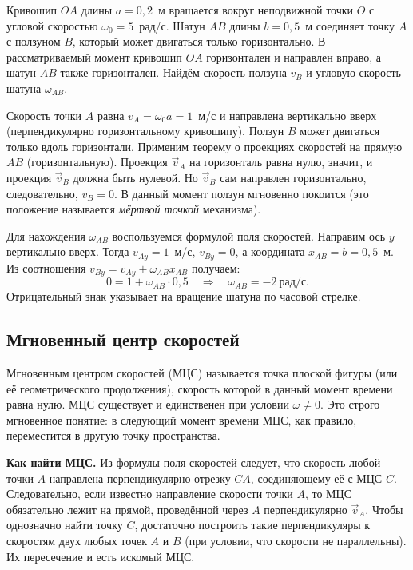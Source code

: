 \documentclass[../main.tex]{subfiles}
\begin{document}
\begin{example}
Кривошип $OA$ длины $a = 0{,}2$~м вращается вокруг неподвижной точки $O$
с угловой скоростью $\omega_0 = 5$~рад/с.
Шатун $AB$ длины $b = 0{,}5$~м соединяет точку $A$ с ползуном $B$,
который может двигаться только горизонтально.
В рассматриваемый момент кривошип $OA$ горизонтален и направлен вправо,
а шатун $AB$ также горизонтален. Найдём скорость ползуна $v_B$
и угловую скорость шатуна $\omega_{AB}$.

Скорость точки $A$ равна $v_A = \omega_0 a = 1$~м/с и направлена
вертикально вверх (перпендикулярно горизонтальному кривошипу).
Ползун $B$ может двигаться только вдоль горизонтали.
Применим теорему о проекциях скоростей на прямую $AB$ (горизонтальную).
Проекция $\vec{v}_A$ на горизонталь равна нулю, значит,
и проекция $\vec{v}_B$ должна быть нулевой. Но $\vec{v}_B$ сам направлен
горизонтально, следовательно, $v_B = 0$.
В данный момент ползун мгновенно покоится (это положение называется
\textit{мёртвой точкой} механизма).

Для нахождения $\omega_{AB}$ воспользуемся формулой поля скоростей.
Направим ось $y$ вертикально вверх. Тогда $v_{Ay} = 1$~м/с, $v_{By} = 0$,
а координата $x_{AB} = b = 0{,}5$~м.
Из соотношения $v_{By} = v_{Ay} + \omega_{AB} x_{AB}$ получаем:
\[
0 = 1 + \omega_{AB} \cdot 0{,}5 \quad\Longrightarrow\quad
\omega_{AB} = -2~\text{рад/с}.
\]
Отрицательный знак указывает на вращение шатуна по часовой стрелке.
\end{example}

\subsection{Мгновенный центр скоростей}

\begin{definition}
Мгновенным центром скоростей (МЦС) называется точка плоской фигуры
(или её геометрического продолжения), скорость которой в данный момент
времени равна нулю. МЦС существует и единственен при условии $\omega \ne 0$.
Это строго мгновенное понятие: в следующий момент времени МЦС, как правило,
переместится в другую точку пространства.
\end{definition}

\noindent\textbf{Как найти МЦС.}
Из формулы поля скоростей следует, что скорость любой точки $A$ направлена
перпендикулярно отрезку $CA$, соединяющему её с МЦС $C$. Следовательно,
если известно направление скорости точки $A$, то МЦС обязательно лежит на
прямой, проведённой через $A$ перпендикулярно $\vec{v}_A$. Чтобы однозначно
найти точку $C$, достаточно построить такие перпендикуляры к скоростям
двух любых точек $A$ и $B$ (при условии, что скорости не параллельны).
Их пересечение и есть искомый МЦС.
\end{document}
